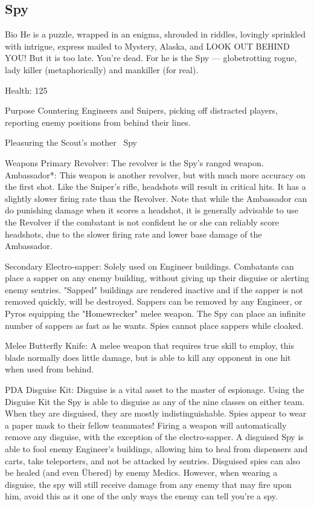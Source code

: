 \subsection{Spy}
Bio
He is a puzzle, wrapped in an enigma, shrouded in riddles, lovingly sprinkled with intrigue, express mailed to Mystery, Alaska, and LOOK OUT BEHIND YOU! But it is too late. You're dead. For he is the Spy — globetrotting rogue, lady killer (metaphorically) and mankiller (for real).

Health: 125

Purpose
Countering Engineers and Snipers, picking off distracted players, reporting enemy positions from behind their lines.

Pleasuring the Scout's mother ~Spy

Weapons
Primary
Revolver: The revolver is the Spy's ranged weapon.
Ambassador*: This weapon is another revolver, but with much more accuracy on the first shot.  Like the Sniper's rifle, headshots will result in critical hits.  It has a slightly slower firing rate than the Revolver. Note that while the Ambassador can do punishing damage when it scores a headshot, it is generally advisable to use the Revolver if the combatant is not confident he or she can reliably score headshots, due to the slower firing rate and lower base damage of the Ambassador.

Secondary
Electro-sapper: Solely used on Engineer buildings.  Combatants can place a sapper on any enemy building, without giving up their disguise or alerting enemy sentries.  "Sapped" buildings are rendered inactive and if the sapper is not removed quickly, will be destroyed. Sappers can be removed by any Engineer, or Pyros equipping the "Homewrecker" melee weapon. The Spy can place an infinite number of sappers as fast as he wants. Spies cannot place sappers while cloaked.

Melee
Butterfly Knife: A melee weapon that requires true skill to employ, this blade normally does little damage, but is able to kill any opponent in one hit when used from behind.

PDA
Disguise Kit: Disguise is a vital asset to the master of espionage.  Using the Disguise Kit the Spy is able to disguise as any of the nine classes on either team. When they are disguised, they are mostly indistinguishable.  Spies appear to wear a paper mask to their fellow teammates!  Firing a weapon will automatically remove any disguise, with the exception of the electro-sapper. A disguised Spy is able to fool enemy Engineer's buildings, allowing him to heal from dispensers and carts, take teleporters, and not be attacked by sentries.  Disguised spies can also be healed (and even Übered) by enemy Medics. However, when wearing a disguise, the spy will still receive damage from any enemy that may fire upon him, avoid this as it one of the only ways the enemy can tell you're a spy.

